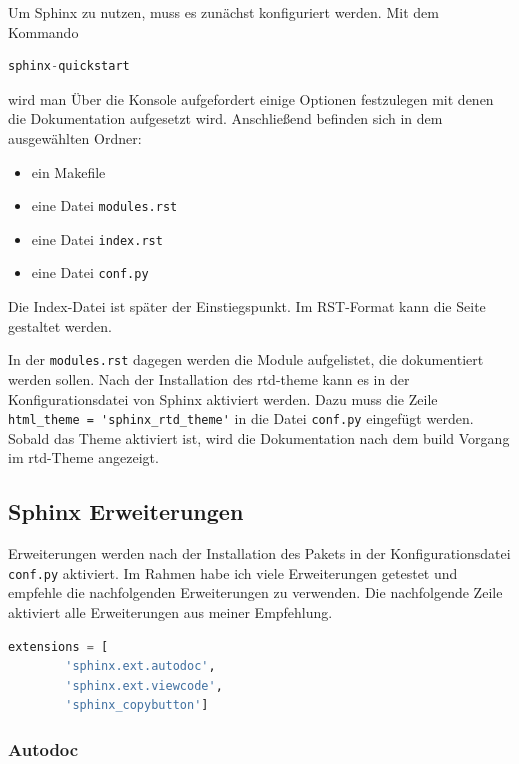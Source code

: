 Um Sphinx zu nutzen, muss es zunächst konfiguriert werden. Mit dem Kommando

\begin{lstlisting}[language = python]
        sphinx-quickstart
\end{lstlisting}
wird man Über die Konsole aufgefordert einige Optionen festzulegen mit denen die Dokumentation aufgesetzt wird.
Anschließend befinden sich in dem ausgewählten Ordner:
\begin{itemize}
        \item ein Makefile
        \item eine Datei \verb|modules.rst|
        \item eine Datei \verb|index.rst|
        \item eine Datei \verb|conf.py|
\end{itemize}

Die Index-Datei ist später der Einstiegspunkt.
Im RST-Format \cite{sphinxRST}kann die Seite gestaltet werden.

In der \verb|modules.rst| dagegen werden die Module aufgelistet, die dokumentiert werden sollen.
Nach der Installation des rtd-theme kann es in der Konfigurationsdatei von Sphinx aktiviert werden.
Dazu muss die Zeile \verb|html_theme = 'sphinx_rtd_theme'| in die Datei \verb|conf.py| eingefügt werden.
Sobald das Theme aktiviert ist, wird die Dokumentation nach dem build Vorgang im rtd-Theme angezeigt.

\subsection{Sphinx Erweiterungen}\label{subsec:sphinx-erweiterungen}

Erweiterungen werden nach der Installation des Pakets in der Konfigurationsdatei \verb|conf.py| aktiviert.
Im Rahmen habe ich viele Erweiterungen getestet und empfehle die nachfolgenden Erweiterungen zu verwenden. 
Die nachfolgende Zeile aktiviert alle Erweiterungen aus meiner Empfehlung. 

\begin{lstlisting}[language = python,label={lst:sphinxExt}]
extensions = [
        'sphinx.ext.autodoc',
        'sphinx.ext.viewcode',
        'sphinx_copybutton']
\end{lstlisting}

\subsubsection{Autodoc}

